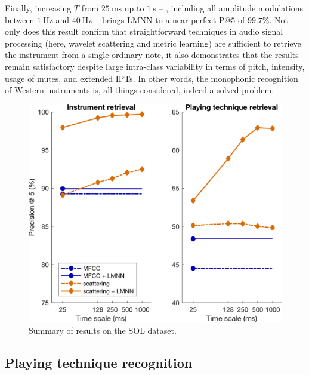 Finally, increasing $T$ from $\SI{25}{\milli\second}$ up to $\SI{1}{\second}$ -- \ie{}, including all amplitude modulations between $\SI{1}{\Hz}$ and $\SI{40}{\Hz}$ -- brings LMNN to a near-perfect P@$5$ of $99.7\%$.
Not only does this result confirm that straightforward techniques in audio signal processing (here, wavelet scattering and metric learning) are sufficient to retrieve the instrument from a single ordinary note, it also demonstrates that the results remain satisfactory despite large intra-class variability in terms of pitch, intensity, usage of mutes, and extended IPTs.
In other words, the monophonic recognition of Western instruments is, all things considered, indeed a solved problem.

\begin{figure}
\includegraphics[width=\linewidth,keepaspectratio]{./figs/results/results.png}
\caption{Summary of results on the SOL dataset.}
\label{fig:results}
\end{figure}

\subsection{Playing technique recognition}

